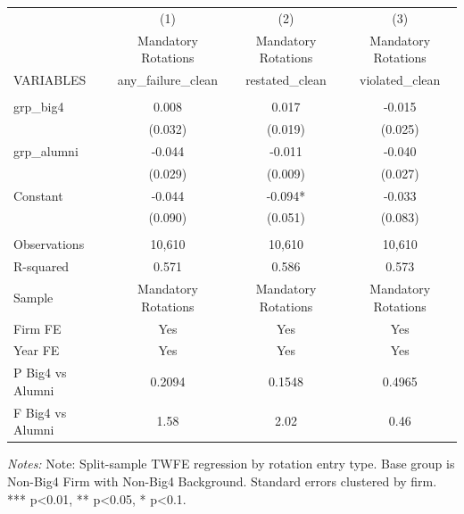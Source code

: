 \documentclass[10pt]{article}
\begin{document}
\begin{minipage}{19cm}\fontsize{10}{12}\selectfont\setlength{\tabcolsep}{4pt}\renewcommand{\arraystretch}{1.12}


\centering
{}
\begin{threeparttable}
\begin{tabular}{p{}ccc}
\toprule
 & (1) & (2) & (3) \\
 & Mandatory Rotations & Mandatory Rotations & Mandatory Rotations \\
VARIABLES & any\_failure\_clean & restated\_clean & violated\_clean \\
\midrule
 &  &  &  \\
grp\_big4 & 0.008 & 0.017 & -0.015 \\
 & (0.032) & (0.019) & (0.025) \\
grp\_alumni & -0.044 & -0.011 & -0.040 \\
 & (0.029) & (0.009) & (0.027) \\
Constant & -0.044 & -0.094* & -0.033 \\
 & (0.090) & (0.051) & (0.083) \\
 &  &  &  \\
Observations & 10,610 & 10,610 & 10,610 \\
R-squared & 0.571 & 0.586 & 0.573 \\
Sample & Mandatory Rotations & Mandatory Rotations & Mandatory Rotations \\
Firm FE & Yes & Yes & Yes \\
Year FE & Yes & Yes & Yes \\
P Big4 vs Alumni & 0.2094 & 0.1548 & 0.4965 \\
F Big4 vs Alumni & 1.58 & 2.02 & 0.46 \\
\bottomrule
\end{tabular}
\begin{tablenotes}\fontsize{9}{11}\selectfont
\item \raggedright \fontsize{9}{11}\selectfont \textit{Notes:} Note: Split-sample TWFE regression by rotation entry type. Base group is Non-Big4 Firm with Non-Big4 Background. Standard errors clustered by firm. *** p<0.01, ** p<0.05, * p<0.1.
\end{tablenotes}
\end{threeparttable}

\end{minipage}
\end{document}
